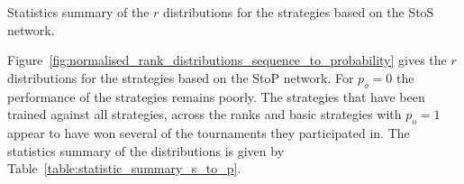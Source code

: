 \begin{table}[!htbp]
    \begin{center}
    \resizebox{\textwidth}{!}{
        
    }
\end{center}
\caption{Statistics summary of the \(r\) distributions for the strategies
based on the StoS network.}\label{table:statistic_summary_s_to_s}
\end{table}

Figure~\ref{fig:normalised_rank_distributions_sequence_to_probability} gives the
\(r\) distributions for the strategies based on the StoP network. For \(p_o=0\)
the performance of the strategies remains poorly. The strategies that have been
trained against all strategies, across the ranks and basic strategies with
\(p_o=1\) appear to have won several of the tournaments they
participated in. The statistics summary of the distributions is given by
Table~\ref{table:statistic_summary_s_to_p}.

